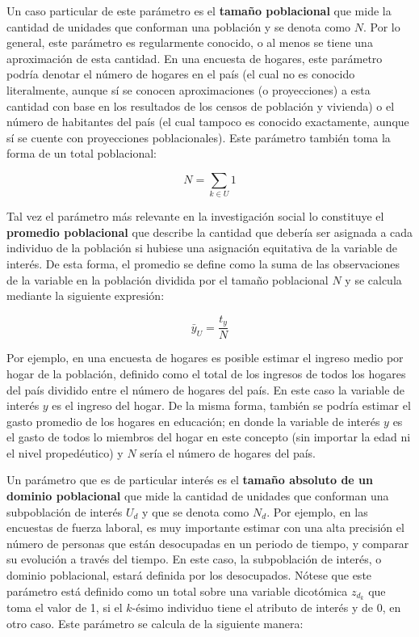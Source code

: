 \documentclass[
  12pt,
  spanish,
]{book}
\begin{document}
Un caso particular de este parámetro es el \textbf{tamaño poblacional} que mide la cantidad de unidades que conforman una población y se denota como \(N\). Por lo general, este parámetro es regularmente conocido, o al menos se tiene una aproximación de esta cantidad. En una encuesta de hogares, este parámetro podría denotar el número de hogares en el país (el cual no es conocido literalmente, aunque sí se conocen aproximaciones (o proyecciones) a esta cantidad con base en los resultados de los censos de población y vivienda) o el número de habitantes del país (el cual tampoco es conocido exactamente, aunque sí se cuente con proyecciones poblacionales). Este parámetro también toma la forma de un total poblacional:

\[N = \sum_{k \in U}1\]

Tal vez el parámetro más relevante en la investigación social lo constituye el \textbf{promedio poblacional} que describe la cantidad que debería ser asignada a cada individuo de la población si hubiese una asignación equitativa de la variable de interés. De esta forma, el promedio se define como la suma de las observaciones de la variable en la población dividida por el tamaño poblacional \(N\) y se calcula mediante la siguiente expresión:

\[\bar{y}_U = \frac{t_y}{N}\]

Por ejemplo, en una encuesta de hogares es posible estimar el ingreso medio por hogar de la población, definido como el total de los ingresos de todos los hogares del país dividido entre el número de hogares del país. En este caso la variable de interés \(y\) es el ingreso del hogar. De la misma forma, también se podría estimar el gasto promedio de los hogares en educación; en donde la variable de interés \(y\) es el gasto de todos lo miembros del hogar en este concepto (sin importar la edad ni el nivel propedéutico) y \(N\) sería el número de hogares del país.

Un parámetro que es de particular interés es el \textbf{tamaño absoluto de un dominio poblacional} que mide la cantidad de unidades que conforman una subpoblación de interés \(U_d\) y que se denota como \(N_d\). Por ejemplo, en las encuestas de fuerza laboral, es muy importante estimar con una alta precisión el número de personas que están desocupadas en un periodo de tiempo, y comparar su evolución a través del tiempo. En este caso, la subpoblación de interés, o dominio poblacional, estará definida por los desocupados. Nótese que este parámetro está definido como un total sobre una variable dicotómica \(z_{d_k}\) que toma el valor de 1, si el \(k\)-ésimo individuo tiene el atributo de interés y de 0, en otro caso. Este parámetro se calcula de la siguiente manera:
\end{document}
